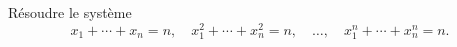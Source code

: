 Résoudre le système
\[ x_1 + \cdots + x_n = n,\quad x_1^2 + \cdots + x_n^2 = n,\quad \ldots,\quad x_1^n + \cdots + x_n^n = n. \]
